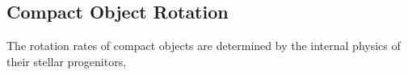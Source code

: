 {\color{orange}

\subsection{Compact Object Rotation}

The rotation rates of compact objects are determined by the internal physics of their stellar progenitors, 

}